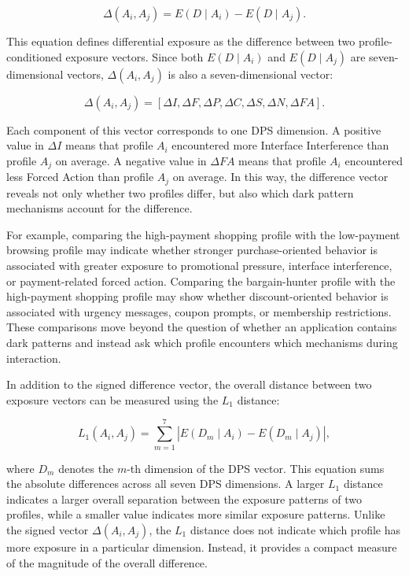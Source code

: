 \begin{equation}
\Delta(A_i, A_j)
=
E(D \mid A_i) - E(D \mid A_j).
\label{eq:differential-exposure}
\end{equation}

This equation defines differential exposure as the difference between two profile-conditioned exposure vectors. Since both $E(D \mid A_i)$ and $E(D \mid A_j)$ are seven-dimensional vectors, $\Delta(A_i, A_j)$ is also a seven-dimensional vector:

\begin{equation}
\Delta(A_i, A_j)
=
[
\Delta I,
\Delta F,
\Delta P,
\Delta C,
\Delta S,
\Delta N,
\Delta FA
].
\label{eq:differential-exposure-vector}
\end{equation}

Each component of this vector corresponds to one DPS dimension. A positive value in $\Delta I$ means that profile $A_i$ encountered more Interface Interference than profile $A_j$ on average. A negative value in $\Delta FA$ means that profile $A_i$ encountered less Forced Action than profile $A_j$ on average. In this way, the difference vector reveals not only whether two profiles differ, but also which dark pattern mechanisms account for the difference.

For example, comparing the high-payment shopping profile with the low-payment browsing profile may indicate whether stronger purchase-oriented behavior is associated with greater exposure to promotional pressure, interface interference, or payment-related forced action. Comparing the bargain-hunter profile with the high-payment shopping profile may show whether discount-oriented behavior is associated with urgency messages, coupon prompts, or membership restrictions. These comparisons move beyond the question of whether an application contains dark patterns and instead ask which profile encounters which mechanisms during interaction.

In addition to the signed difference vector, the overall distance between two exposure vectors can be measured using the $L_1$ distance:

\begin{equation}
L_1(A_i, A_j)
=
\sum_{m=1}^{7}
\left|
E(D_m \mid A_i) - E(D_m \mid A_j)
\right|,
\label{eq:l1-distance}
\end{equation}

where $D_m$ denotes the $m$-th dimension of the DPS vector. This equation sums the absolute differences across all seven DPS dimensions. A larger $L_1$ distance indicates a larger overall separation between the exposure patterns of two profiles, while a smaller value indicates more similar exposure patterns. Unlike the signed vector $\Delta(A_i, A_j)$, the $L_1$ distance does not indicate which profile has more exposure in a particular dimension. Instead, it provides a compact measure of the magnitude of the overall difference.

